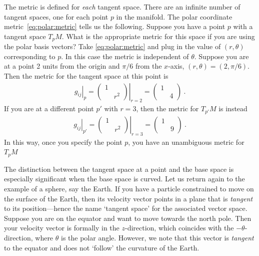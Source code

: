 \documentclass[12pt]{article}
\begin{document}
The metric is defined for \emph{each} tangent space. There are an infinite number of tangent spaces, one for each point $p$ in the manifold. The polar coordinate metric~\eqref{eq:polar:metric} tells us the following. Suppose you have a point $p$ with a tangent space $T_pM$. What is the appropriate metric for this space if you are using the polar basis vectors? Take \eqref{eq:polar:metric} and plug in the value of $(r,\theta)$ corresponding to $p$. In this case the metric is independent of $\theta$. Suppose you are at a point 2 units from the origin and $\pi/6$ from the $x$-axis, $(r,\theta)=(2,\pi/6)$. Then the metric for the tangent space at this point is
\begin{align}
    \left.g_{ij}\right|_p=
    \left.
    \begin{pmatrix}
        1 &\\
        & r^2
    \end{pmatrix}
    \right|_{r=2}
    =
    \begin{pmatrix}
        1 &\\
        & 4
    \end{pmatrix} \ .
\end{align}
If you are at a different point $p'$ with $r=3$, then the metric for $T_{p'}M$ is instead
\begin{align}
    \left.g_{ij}\right|_{p'}=
    \left.
    \begin{pmatrix}
        1 &\\
        & r^2
    \end{pmatrix}
    \right|_{r=3}
    =
    \begin{pmatrix}
        1 &\\
        & 9
    \end{pmatrix} \ .
\end{align}
In this way, once you specify the point $p$, you have an unambiguous metric for $T_pM$ 


\begin{example}
The distinction between the tangent space at a point and the base space is especially significant when the base space is curved. Let us return again to the example of a sphere, say the Earth. If you have a particle constrained to move on the surface of the Earth, then its velocity vector points in a plane that is \emph{tangent} to its position---hence the name `tangent space' for the associated vector space. Suppose you are on the equator and want to move towards the north pole. Then your velocity vector is formally in the $z$-direction, which coincides with the $-\theta$-direction, where $\theta$ is the polar angle. However, we note that this vector is \emph{tangent} to the equator and does not `follow' the curvature of the Earth. 
\end{example}
\end{document}
